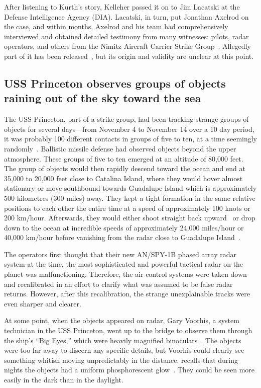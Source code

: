 After listening to Kurth's story, Kelleher passed it on to Jim Lacatski at the Defense Intelligence Agency (DIA). Lacatski, in turn, put Jonathan Axelrod on the case, and within months, Axelrod and his team had comprehensively interviewed and obtained detailed testimony from many witnesses: pilots, radar operators, and others from the Nimitz Aircraft Carrier Strike Group~\cite[p. 41]{Lacatski-2021}.
Allegedly part of it has been released~\cite{ExexSummaryNimitz2019Jun}, but its origin and validity are unclear at this point.

\subsection{USS Princeton observes groups of objects raining out of the sky toward the sea}

The USS Princeton, part of a strike group,
had been tracking strange groups of objects for several days---from November 4 to November 14 over a 10 day period,
it was probably 100 different contacts in groups of five to ten, at a time seemingly randomly~\cite{WestDayKevin2021Feb}.
Ballistic missile defense had observed objects beyond the upper atmosphere.
These groups of five to ten   emerged    at an altitude of 80,000 feet.
The group of objects would then rapidly descend toward the ocean and end at 35,000 to 20,000 feet close to Catalina Island,
where they would hover almost stationary or move southbound towards Guadalupe Island which is approximately 500 kilometres (300 miles) away.
They kept a tight formation in the same relative positions to each other the entire time
at a speed of approximately 100 knots or 200 km/hour.
Afterwards, they would either shoot straight back upward~\cite{Cooper2017Dec} or drop down to the ocean
at incredible speeds of approximately 24,000 miles/hour or 40,000 km/hour
before vanishing from the radar close to Guadalupe Island~\cite{WestDayKevin2021Feb}.


The operators first thought that their new AN/SPY-1B phased array radar
system-at the time, the most sophisticated and powerful tactical radar on the planet-was malfunctioning.
Therefore, the air control systems were taken down and recalibrated in an effort to clarify what was assumed
to be false radar returns. However, after this recalibration, the strange unexplainable tracks were even sharper and clearer.

At some point, when the objects appeared on radar,
Gary Voorhis, a system technician in the USS Princeton,
went up to the bridge to observe them through the ship's ``Big Eyes,''
which were heavily magnified binoculars~\cite{PMWitnesses2021Mar}.
The objects were too far away to discern any specific details, but Voorhis could clearly see something whitish moving unpredictably in the distance.
recalls that during nights the objects had a uniform phosphorescent glow~\cite{WestVoorhis2020Jan}.
They could be seen more easily in the dark than in the daylight.

